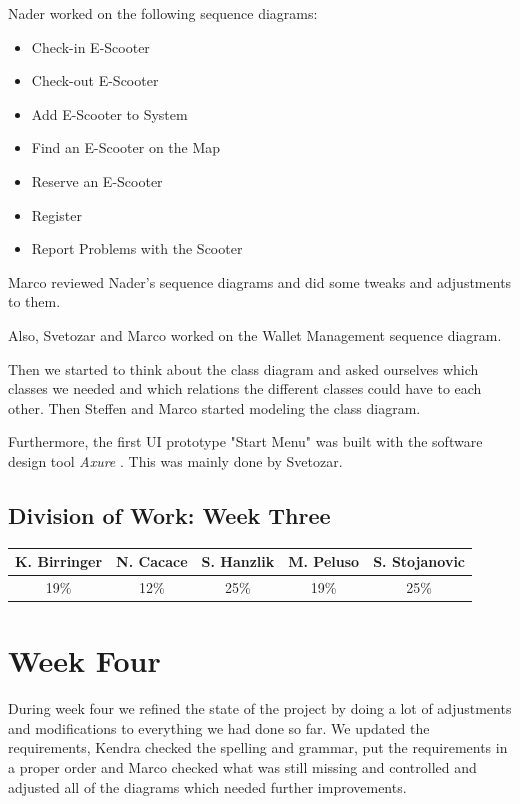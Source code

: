 \documentclass[a4paper, 12pt]{article}
\begin{document}
Nader worked on the following sequence diagrams:
\begin{itemize}
    \item Check-in E-Scooter
    \item Check-out E-Scooter
    \item Add E-Scooter to System
    \item Find an E-Scooter on the Map
    \item Reserve an E-Scooter
    \item Register
    \item Report Problems with the Scooter
\end{itemize}

Marco reviewed Nader's sequence diagrams and did some tweaks and adjustments to them.

Also, Svetozar and Marco worked on the Wallet Management sequence diagram.

Then we started to think about the class diagram and asked ourselves which classes we needed and which relations the different classes could have to each other. Then Steffen and Marco started modeling the class diagram.

Furthermore, the first UI prototype "Start Menu" was built with the software design tool \emph{Axure} \cite{axure}.  This was mainly done by Svetozar. 

\subsection{Division of Work: Week Three}
\begin{table}[htbp]
\centering
\setlength{\tabcolsep}{10pt}
\begin{tabular}{|c|c|c|c|c|}
\hline
K. Birringer & N. Cacace & S. Hanzlik & M. Peluso & S. Stojanovic\\
\hline
19\%   &12\%  &25\%  &19\%  &25\%\\
\hline
\end{tabular}
\end{table}

\section{Week Four}
During week four we refined the state of the project by doing a lot of adjustments and modifications to everything we had done so far. We updated the requirements, Kendra checked the spelling and grammar, put the requirements in a proper order and Marco checked what was still missing and controlled and adjusted all of the diagrams which needed further improvements.
\end{document}
